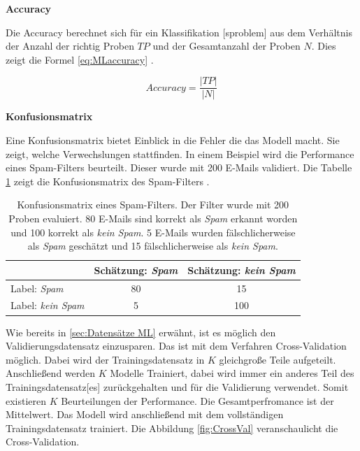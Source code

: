 \textbf{\gls{Accuracy}}\par

Die \gls{Accuracy} berechnet sich für ein \gls{Klassifikation} [sproblem] aus dem Verhältnis der Anzahl der richtig  Proben \(TP\) und der Gesamtanzahl der Proben \(N\). Dies zeigt die Formel \ref{eq:MLaccuracy} \cite{Zheng.2015}.

\begin{equation}
Accuracy = \frac{|TP|}{|N|}
\label{eq:MLaccuracy}
\end{equation}

\textbf{\gls{Konfusionsmatrix}}\par
Eine \gls{Konfusionsmatrix} bietet Einblick in die Fehler die das Modell macht. Sie zeigt, welche Verwechslungen stattfinden. In einem Beispiel wird die Performance eines Spam-Filters beurteilt. Dieser wurde mit 200 E-Mails validiert. Die Tabelle \ref{tab:bspConfMat} zeigt die \gls{Konfusionsmatrix} des Spam-Filters \cite{Zheng.2015}.

\begin{table}[h]
    \centering
    \begin{tabular}{|l|c|c|}
        \hline
                                    & Schätzung: \textit{Spam} & Schätzung: \textit{kein Spam}\\
        \hline
        Label: \textit{Spam}        & 80 & 15 \\
        \hline
        Label: \textit{kein Spam}   &  5 & 100\\
        \hline
    \end{tabular}
    \caption{\gls{Konfusionsmatrix} eines Spam-Filters. Der Filter wurde mit 200 Proben evaluiert. 80 E-Mails sind korrekt als \textit{Spam} erkannt worden und 100 korrekt als \textit{kein Spam}. 5 E-Mails wurden fälschlicherweise als \textit{Spam} geschätzt und 15 fälschlicherweise als \textit{kein Spam}.}
    \label{tab:bspConfMat}
\end{table}

Wie bereits in \ref{sec:Datensätze ML} erwähnt, ist es möglich den Validierungsdatensatz einzusparen. Das ist mit dem Verfahren \gls{Cross-Validation} möglich. Dabei wird der \gls{Trainingsdatensatz} in \(K\) gleichgroße Teile aufgeteilt. Anschließend werden \(K\) Modelle Trainiert, dabei wird immer ein anderes Teil des \gls{Trainingsdatensatz}[es] zurückgehalten und für die Validierung verwendet. Somit existieren \(K\) Beurteilungen der Performance. Die Gesamtperfromance ist der Mittelwert. Das Modell wird anschließend mit dem vollständigen \gls{Trainingsdatensatz} trainiert. Die Abbildung \ref{fig:CrossVal} veranschaulicht die \gls{Cross-Validation}.


